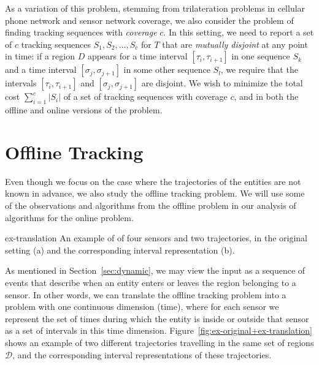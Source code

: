 \documentclass[runningheads]{llncs}
\newcommand {\script} [1] {\ensuremath {\mathcal {#1}}}
\newcommand{\marrow}{\marginpar[\hfill$\longrightarrow$]{$\longleftarrow$}}
\renewcommand{\remark}[3]{\textcolor{blue}{\textsc{#1 #2:}}
\textcolor{red}{\marrow\textsf{#3}}}
\renewcommand{\remark}[3]{\relax}
\newcommand{\maarten}[2][says]{\remark{Maarten}{#1}{#2}}
\begin{document}
\maarten {I changed this back to the old definition of having $c$ disjoint sequences, because it's not the same thing: we want to allow newer additions to expire before older additions.}

As a variation of this problem, stemming  from trilateration problems in cellular phone network and sensor network coverage, we also consider the problem of finding tracking sequences with \emph{coverage} $c$. In this setting, we need to report a set of $c$ tracking sequences $S_1, S_2, \ldots, S_c$ for $T$ that are \emph {mutually disjoint} at any point in time: if a region $D$ appears for a time interval $[\tau_i, \tau_{i+1}]$ in one sequence $S_k$ and a time interval $[\sigma_j, \sigma_{j+1}]$ in some other sequence $S_l$, we require that the intervals $[\tau_i, \tau_{i+1}]$ and $[\sigma_j, \sigma_{j+1}]$ are disjoint. We wish to minimize the total cost $\sum_{i=1}^c |S_i|$ of a set of tracking sequences with coverage $c$, and in both the offline and online versions of the problem.

\section {Offline Tracking} \label {sec:static}



Even though we focus on the case where the trajectories of the entities are not known in advance, we also study the offline tracking problem. We will use some of the observations and algorithms from the offline problem in our analysis of algorithms for the online problem.

     {ex-translation} {An example of of four sensors and two trajectories, in the original setting (a) and the corresponding interval representation (b).}
  
    As mentioned in Section~\ref {sec:dynamic}, we may view the input as a sequence of events that describe when an entity enters or leaves the region belonging to a sensor.
    In other words, we can translate the offline tracking problem into a problem with one continuous dimension (time), where for each sensor we represent the set of times during which the entity is inside or outside that sensor as a set of intervals in this time dimension.
    Figure~\ref {fig:ex-original+ex-translation} shows an example of two different trajectories travelling in the same set of regions $\script D$, and the corresponding interval representations of these trajectories.
\end{document}
